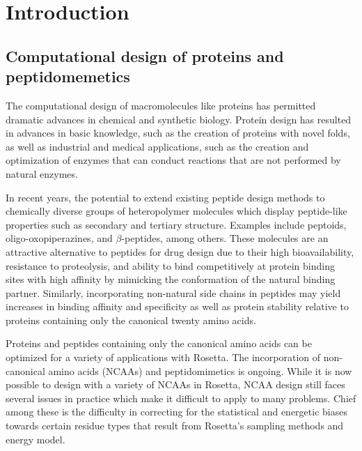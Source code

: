 \section{Introduction}
\subsection{Computational design of proteins and peptidomemetics}
The computational design of macromolecules like proteins has permitted dramatic advances in chemical and synthetic biology.
Protein design has resulted in advances in basic knowledge, such as the creation of proteins with novel folds\cite{kuhlman_design_2003}, as well as industrial and medical applications, such as the creation and optimization of enzymes that can conduct reactions that are not performed by natural enzymes\cite{jiang_denovo_2008,rothlisberger_kemp_2008}.

In recent years, the potential to extend existing peptide design methods to chemically diverse groups of heteropolymer molecules which display peptide-like properties such as secondary and tertiary structure.
Examples include peptoids\cite{renfrew_incorporation_2012}, oligo-oxopiperazines\cite{lao_rational_2014}, and $\beta$-peptides\cite{molski_remodeling_2012}, among others.
These molecules are an attractive alternative to peptides for drug design due to their high bioavailability, resistance to proteolysis, and ability to bind competitively at protein binding sites with high affinity by mimicking the conformation of the natural binding partner\cite{lao_rational_2014}.
Similarly, incorporating non-natural side chains in peptides may yield increases in binding affinity and specificity as well as protein stability relative to proteins containing only the canonical twenty amino acids\cite{horng_values_2003}.

Proteins and peptides containing only the canonical amino acids can be optimized for a variety of applications with Rosetta\cite{leaver-fay_chapter_2011,jiang_denovo_2008,rothlisberger_kemp_2008,raveh_scheuler_furman_2011}.
The incorporation of non-canonical amino acids (NCAAs) and peptidomimetics is ongoing.
While it is now possible to design with a variety of NCAAs in Rosetta\cite{renfrew_incorporation_2012,drew_adding_2013}, NCAA design still faces several issues in practice which make it difficult to apply to many problems.
Chief among these is the difficulty in correcting for the statistical and energetic biases towards certain residue types that result from Rosetta's sampling methods and energy model.

